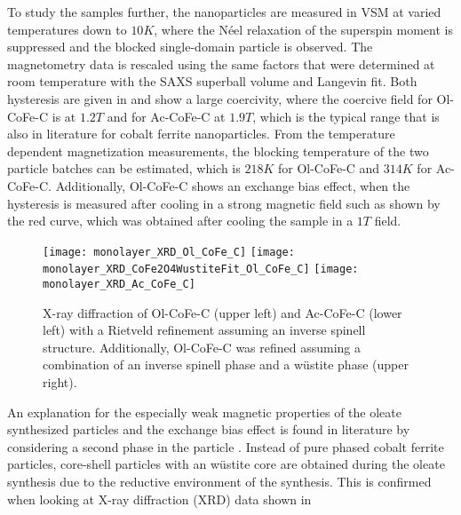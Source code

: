 \documentclass[\main/dresen_thesis.tex]{subfiles}
\begin{document}
    To study the samples further, the nanoparticles are measured in VSM at varied temperatures down to $10 \unit{K}$, where the N\'eel relaxation of the superspin moment is suppressed and the blocked single-domain particle is observed.
    The magnetometry data is rescaled using the same factors that were determined at room temperature with the SAXS superball volume and Langevin fit.
    Both hysteresis are given in  and show a large coercivity, where the coercive field for Ol-CoFe-C is at $1.2 \unit{T}$ and for Ac-CoFe-C at $1.9 \unit{T}$, which is the typical range that is also in literature for cobalt ferrite nanoparticles.
    From the temperature dependent magnetization measurements, the blocking temperature of the two particle batches can be estimated, which is $218 \unit{K}$ for Ol-CoFe-C and $314 \unit{K}$ for Ac-CoFe-C.
    Additionally, Ol-CoFe-C shows an exchange bias effect, when the hysteresis is measured after cooling in a strong magnetic field such as shown by the red curve, which was obtained after cooling the sample in a $1 \unit{T}$ field.

    \begin{figure}[tb]
      \centering
      \texttt{[image: monolayer\_XRD\_Ol\_CoFe\_C]}
      \texttt{[image: monolayer\_XRD\_CoFe2O4WustiteFit\_Ol\_CoFe\_C]}
      \texttt{[image: monolayer\_XRD\_Ac\_CoFe\_C]}
      \caption{\label{fig:monolayers:nanoparticle:xrd}X-ray diffraction of Ol-CoFe-C (upper left) and Ac-CoFe-C (lower left) with a Rietveld refinement assuming an inverse spinell structure. Additionally, Ol-CoFe-C was refined assuming a combination of an inverse spinell phase and a w\"ustite phase (upper right).}
    \end{figure}

    An explanation for the especially weak magnetic properties of the oleate synthesized particles and the exchange bias effect is found in literature by considering a second phase in the particle \cite{Bodnarchuk_2009_Excha, Wetterskog_2013_Anoma}.
    Instead of pure phased cobalt ferrite particles, core-shell particles with an w\"ustite core are obtained during the oleate synthesis due to the reductive environment of the synthesis.
    This is confirmed when looking at X-ray diffraction (XRD) data shown in 
\end{document}
